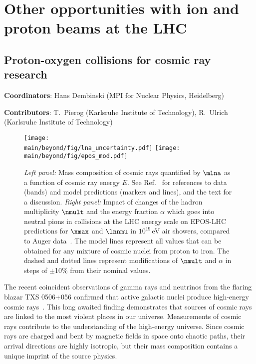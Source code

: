 \documentclass[../report.tex]{subfiles}
\providecommand{\main}{..}
\begin{document}
\section{Other opportunities with ion and proton beams at the LHC}


\clearpage




\clearpage
\subsection{Proton-oxygen collisions for cosmic ray research}
\label{sec:pOcosmic}
{ \small
\noindent \textbf{Coordinators}: Hans Dembinski (MPI for Nuclear Physics, Heidelberg)

\noindent \textbf{Contributors}: 
T.~Pierog (Karlsruhe Institute of Technology), 
R.~Ulrich (Karlsruhe Institute of Technology)
}

\begin{figure}
\texttt{[image: \\main/beyond/fig/lna\_uncertainty.pdf]}
\texttt{[image: \\main/beyond/fig/epos\_mod.pdf]}
\caption{\emph{Left panel:} Mass composition of cosmic rays quantified by $\mlna$ as a function of cosmic ray energy $E$. See Ref.~\cite{kampert_cr_review} for references to data (bands) and model predictions (markers and lines), and the text for a discussion. \emph{Right panel:} Impact of changes of the hadron multiplicity $\nmult$ and the energy fraction $\alpha$ which goes into neutral pions in collisions at the LHC energy scale on EPOS-LHC predictions for $\xmax$ and $\lnnmu$ in $10^{19}$\,\si{eV} air showers, compared to Auger data~\cite{Aab:2014pza}. The model lines represent all values that can be obtained for any mixture of cosmic nuclei from proton to iron. The dashed and dotted lines represent modifications of $\nmult$ and $\alpha$ in steps of $\pm$10\% from their nominal values.}
\label{fig:cosmic_rays}
\end{figure}

The recent coincident observations of gamma rays and neutrinos from the flaring blazar TXS 0506+056 confirmed that active galactic nuclei produce high-energy cosmic rays~\cite{IceCube:2018dnn}. This long awaited finding demonstrates that sources of cosmic rays are linked to the most violent places in our universe. Measurements of cosmic rays contribute to the understanding of the high-energy universe. Since cosmic rays are charged and bent by magnetic fields in space onto chaotic paths, their arrival directions are highly isotropic, but their mass composition contains a unique imprint of the source physics.
\end{document}
